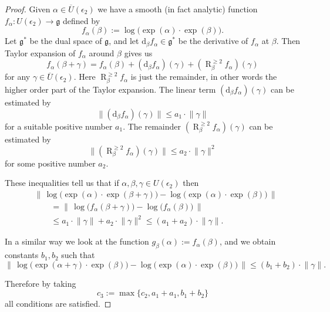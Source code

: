 \documentclass[10pt, a4paper]{amsart}
\theoremstyle{definition}
\numberwithin{equation}{section}
\newcommand{\opn}{\operatorname}
\newcommand{\ol}{\overline}
\newcommand{\mfrak}[1]{\mathfrak{#1}}
\newcommand{\mrm}[1]{\mathrm{#1}}
\newcommand{\norm}[1]{\lVert #1 \rVert}
\newcommand{\Norm}[1]{\bigl\lVert\, #1 \, \bigr\rVert}
\newcommand{\g}{\mfrak{g}}
\renewcommand{\d}{\mrm{d}}
\begin{document}
\begin{proof}
Given $\alpha \in \ol{U}(\epsilon_2)$ we have a smooth
(in fact analytic) function
$f_{\alpha} : U(\epsilon_2) \to \g$ defined by
\[ f_{\alpha}(\beta) := \log 
\bigl( \opn{exp}(\alpha) \cdot \opn{exp}(\beta) \bigr) . \]
Let $\g^*$ be the dual space of $\g$, and let 
$\d_{\beta} f_{\alpha} \in \g^*$
be the derivative of $f_{\alpha}$ at $\beta$. 
Then Taylor expansion of $f_{\alpha}$ around $\beta$ gives us
\begin{equation} \label{eqn15}
f_{\alpha}(\beta + \gamma) = f_{\alpha}(\beta) +
(\d_{\beta} f_{\alpha})(\gamma) +
(\opn{R}_{\beta}^{\geq 2} f_{\alpha})(\gamma)
\end{equation}
for any $\gamma \in \ol{U}(\epsilon_2)$. 
Here $\opn{R}_{\beta}^{\geq 2} f_{\alpha}$ is just the remainder, in other
words the higher order part of the Taylor expansion. 
The linear term 
$(\d_{\beta} f_{\alpha})(\gamma)$ 
can be estimated by
\[ \norm{ (\d_{\beta} f_{\alpha})(\gamma)  } \leq
a_1 \cdot \norm{\gamma}  \]
for a suitable positive number $a_1$. 
The remainder $(\opn{R}_{\beta}^{\geq 2} f_{\alpha})(\gamma)$ can be
estimated by
\[ \norm{ (\opn{R}_{\beta}^{\geq 2} f_{\alpha})(\gamma) } 
\leq a_2 \cdot \norm{\gamma}^2  \]
for some positive number $a_2$. 

These inequalities tell us that if 
$\alpha, \beta, \gamma \in U(\epsilon_2)$ then 
\begin{equation} \label{eqn17}
\begin{aligned}
& \Norm{ \opn{log} \bigl( \opn{exp}(\alpha) \cdot 
\opn{exp}(\beta + \gamma) \bigr) -  
\opn{log} \bigl( \opn{exp}(\alpha) \cdot 
\opn{exp}(\beta) \bigr) } \\
& \qquad
= \Norm{ \opn{log} \bigl( f_{\alpha}(\beta + \gamma) \bigr) -  
\opn{log} \bigl( f_{\alpha}(\beta) \bigr) } \\
& \qquad
\leq a_1 \cdot \norm{\gamma} + a_2 \cdot \norm{\gamma}^2
\leq (a_1 + a_2) \cdot \norm{\gamma} . 
\end{aligned} 
\end{equation}

In a similar way we look at the function 
$g_{\beta}(\alpha) := f_{\alpha}(\beta)$, 
and we obtain constants $b_1, b_2$ such that
\begin{equation}  \label{eqn18}
\Norm{ \opn{log} \bigl( \opn{exp}(\alpha + \gamma) \cdot 
\opn{exp}(\beta) \bigr) -  
\opn{log} \bigl( \opn{exp}(\alpha) \cdot 
\opn{exp}(\beta) \bigr) } 
\leq (b_1 + b_2) \cdot \norm{\gamma} .
\end{equation}

Therefore by taking
\[ c_3 := \max \{ c_2, a_1 + a_1, b_1 + b_2  \} \]
all conditions are satisfied.
\end{proof}
\end{document}

